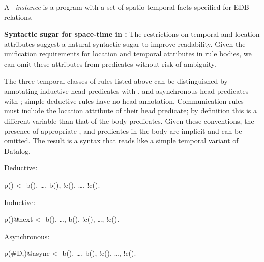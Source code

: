 A \lang\ {\em instance} is a program with a set of spatio-temporal facts specified for EDB relations. 

\noindent
\textbf{Syntactic sugar for space-time in \lang:}
The restrictions on temporal and location attributes suggest a natural syntactic sugar to improve readability.  Given the unification requirements for location and temporal attributes in rule bodies, we can omit these attributes from predicates without risk of ambiguity.  

The three temporal classes of rules listed above can be distinguished by annotating inductive head predicates with , and asynchronous head predicates with ; simple deductive rules have no head annotation. 
Communication rules must include the location attribute of their head predicate; by definition this is a different variable than that of the body predicates.
 Given these conventions, the presence of appropriate ,  and  predicates in the body are implicit and can be omitted.  The result is a syntax that reads like a simple temporal variant of Datalog.

Deductive:

\begin{Dedalus}
p() <- b(), \ldots, b(),
!c(), \ldots, !c().
\end{Dedalus}

Inductive:

\begin{Dedalus}
p()@next <- b(), \ldots, b(),   
!c(), \ldots, !c().
\end{Dedalus}

%

Asynchronous:

\begin{Dedalus}
p(#D,)@async <- b(), \ldots, b(),
!c(), \ldots, !c().
\end{Dedalus}

